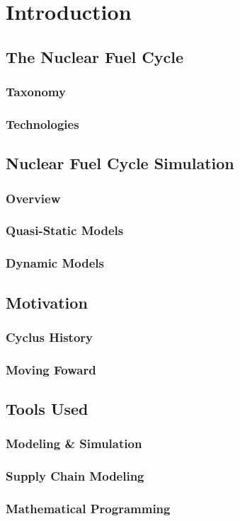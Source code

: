 \chapter{Introduction}\label{ch:intro}

\section{The Nuclear Fuel Cycle}

\subsection{Taxonomy}

\subsection{Technologies}

\section{Nuclear Fuel Cycle Simulation}

\subsection{Overview}

\subsection{Quasi-Static Models}

\subsection{Dynamic Models}

\section{Motivation}

\subsection{Cyclus History}

\subsection{Moving Foward}

\section{Tools Used}

\subsection{Modeling \& Simulation}

\subsection{Supply Chain Modeling}

\subsection{Mathematical Programming}
